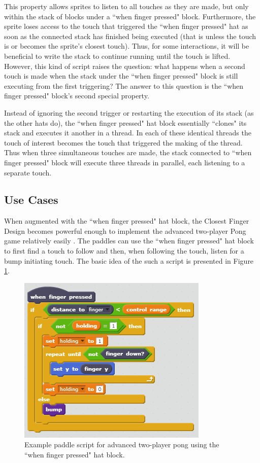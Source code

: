 This property allows sprites to listen to all touches as they are made, but only within the stack of blocks under a ``when finger pressed" block. Furthermore, the sprite loses access to the touch that triggered the ``when finger pressed" hat as soon as the connected stack has finished being executed (that is unless the touch is or becomes the sprite's closest touch). Thus, for some interactions, it will be beneficial to write the stack to continue running until the touch is lifted. However, this kind of script raises the question: what happens when a second touch is made when the stack under the ``when finger pressed" block is still executing from the first triggering? The answer to this question is the ``when finger pressed" block's second special property.

Instead of ignoring the second trigger or restarting the execution of its stack (as the other hats do), the ``when finger pressed" hat block essentially ``clones" its stack and executes it another in a thread. In each of these identical threads the touch of interest becomes the touch that triggered the making of the thread. Thus when three simultaneous touches are made, the stack connected to ``when finger pressed" block will execute three threads in parallel, each listening to a separate touch.
 
\subsection{Use Cases}

When augmented with the ``when finger pressed" hat block, the Closest Finger Design becomes powerful enough to implement the advanced two-player Pong game relatively easily . The paddles can use the ``when finger pressed" hat block to first find a touch to follow and then, when following the touch, listen for a bump initiating touch. The basic idea of the such a script is presented in Figure \ref{AdvancedTwoPlayerPongCFD}.

\begin{figure}
\centering
\includegraphics{images/AdvancedTwoPlayerPongCFD.PNG}
\caption{Example paddle script for advanced two-player pong using the ``when finger pressed" hat block.}
\label{AdvancedTwoPlayerPongCFD}
\end{figure}

